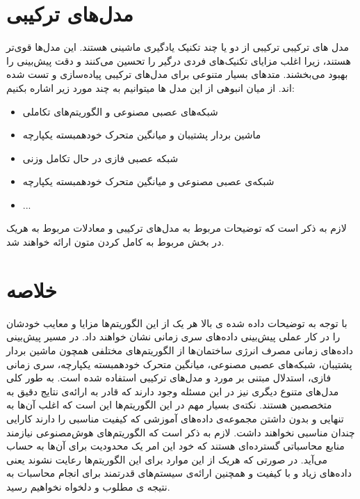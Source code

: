 \section{مدل‌های ترکیبی‌\protect{}}
مدل های ترکیبی ترکیبی از دو یا چند تکنیک یادگیری ماشینی هستند. این مدل‌ها قوی‌تر هستند، 
زیرا اغلب مزایای تکنیک‌های فردی درگیر را تحسین می‌کنند و دقت پیش‌بینی را بهبود می‌بخشند.
متد‌های بسیار متنوعی برای مدل‌های ترکیبی پیاده‌سازی و تست شده اند. از میان انبوهی از این مدل ها میتوانیم به چند مورد زیر اشاره بکنیم:
\begin{itemize}
    \item شبکه‌های عصبی مصنوعی و الگوریتم‌های تکاملی\cite{azadeh2007integration}
    \item ماشین بردار پشتیبان و میانگین متحرک خودهمبسته یکپارچه\cite{nie2012hybrid}
    \item شبکه عصبی فازی در حال تکامل وزنی \cite{chang2011monthly}
    \item شبکه‌ی عصبی مصنوعی و میانگین متحرک خودهمبسته یکپارچه\cite{wang2014techniques}
    \item ...
\end{itemize}

لازم به ذکر است که توضیحات مربوط به مدل‌های ترکیبی و معادلات مربوط به هریک در بخش مربوط به کامل کردن متون ارائه خواهند شد.
\section{خلاصه}

با توجه به توضیحات داده شده ی بالا هر یک از این الگوریتم‌ها مزایا و معایب خودشان را در کار عملی پیش‌بینی داده‌های سری زمانی نشان خواهند داد. 
 در مسیر پیش‌بینی داده‌های زمانی مصرف انرژی ساختمان‌ها از الگوریتم‌های مختلفی همچون 
 ماشین بردار پشتیبان، شبکه‌های عصبی مصنوعی، میانگین متحرک خودهمبسته یکپارچه، سری زمانی فازی، استدلال مبتنی بر مورد و مدل‌های ترکیبی استفاده شده است.
 به طور کلی مدل‌های متنوع دیگری نیز در این مسئله وجود دارند که قادر به ارائه‌ی نتایج دقیق به متخصصین هستند. نکته‌ی بسیار مهم در این الگوریتم‌ها این است که اغلب آن‌ها به تنهایی و بدون داشتن مجموعه‌ی داده‌های آموزشی که کیفیت مناسبی را دارند
 کارایی چندان مناسبی نخواهند داشت. لازم به ذکر است که الگوریتم‌های هوش‌مصنوعی نیازمند منابع محاسباتی گسترده‌ای هستند که خود این امر یک محدودیت برای آن‌ها به حساب می‌آید.
 در صورتی که هریک از این موارد برای این الگوریتم‌ها رعایت نشوند یعنی داده‌های زیاد و با کیفیت و همچنین ارائه‌ی سیستم‌های قدرتمند برای انجام محاسبات به نتیجه ی مطلوب و دلخواه نخواهیم رسید.